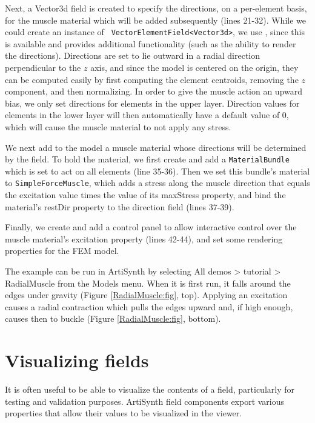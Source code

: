 Next, a Vector3d field is created to specify the directions, on a
per-element basis, for the muscle material which will be added subsequently
(lines 21-32). While we could create an instance of {\tt
VectorElementField<Vector3d>}, we use
, since this
is available and provides additional functionality (such as the
ability to render the directions). Directions are set to lie outward
in a radial direction perpendicular to the $z$ axis, and since the
model is centered on the origin, they can be computed easily by first
computing the element centroids, removing the $z$ component, and then
normalizing. In order to give the muscle action an upward bias, we
only set directions for elements in the upper layer. Direction values
for elements in the lower layer will then automatically have a default
value of 0, which will cause the muscle material to not apply any
stress.

We next add to the model a muscle material whose directions will be
determined by the field. To hold the material, we first create and add
a {\tt MaterialBundle} which is set to act on all elements (line
35-36). Then we set this bundle's material to {\tt SimpleForceMuscle},
which adds a stress along the muscle direction that equals the
excitation value times the value of its {\sf maxStress} property, and
bind the material's {\sf restDir} property to the direction field
(lines 37-39).

Finally, we create and add a control panel to allow interactive
control over the muscle material's excitation property (lines 42-44),
and set some rendering properties for the FEM model.


The example can be run in ArtiSynth by selecting {\sf All demos >
tutorial > RadialMuscle} from the {\sf Models} menu.  When it is first
run, it falls around the edges under gravity (Figure
\ref{RadialMuscle:fig}, top). Applying an excitation causes a radial
contraction which pulls the edges upward and, if high enough, causes
then to buckle (Figure \ref{RadialMuscle:fig}, bottom).


\section{Visualizing fields}

It is often useful to be able to visualize the contents of a field,
particularly for testing and validation purposes. ArtiSynth field
components export various properties that allow their values to be
visualized in the viewer.

